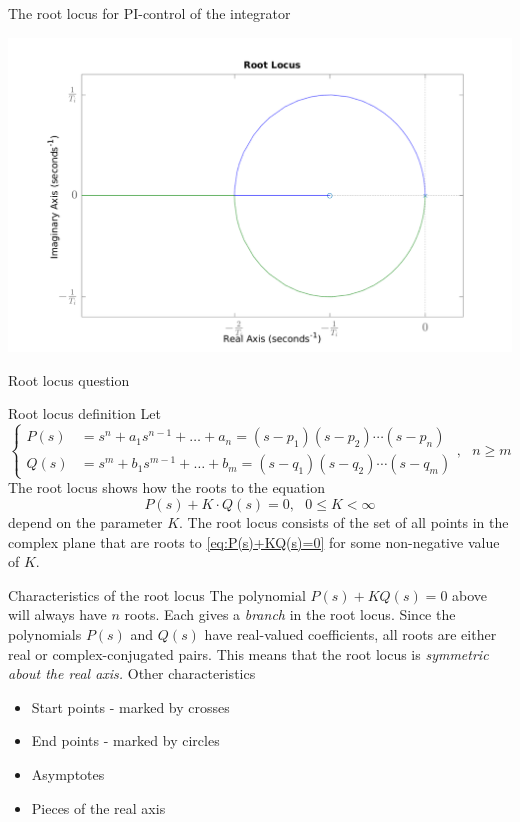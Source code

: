 \documentclass[presentation,aspectratio=169]{beamer}
\begin{document}
\begin{frame}[label={sec:org713aeac}]{The root locus for PI-control of the integrator}
\begin{center}
\includegraphics[width=0.8\linewidth]{../../figures/rlocus-integrator-PI}
\end{center}
\end{frame}

\begin{frame}[label={sec:org199e90e}]{Root locus question}
\end{frame}

\begin{frame}[label={sec:orgb1887b7}]{Root locus definition}
Let
\[\begin{cases} P(s)&=s^n+a_1s^{n-1}+\dots+a_n = (s-p_1)(s-p_2)\cdots(s-p_n)\\ 
Q(s)&=s^m+b_1s^{m-1}+\dots+b_m=(s-q_1)(s-q_2)\cdots(s-q_m) \end{cases},\ \ \ n\ge m \]
The root locus shows how the roots to the equation
\begin{equation}
\label{eq:P(s)+KQ(s)=0}
P(s)+K\cdot Q(s)=0,\ \ \ 0\le K<\infty
\end{equation}
depend on the parameter \(K\). The root locus consists of the set of all points in the complex plane that are roots to \eqref{eq:P(s)+KQ(s)=0} for some non-negative value of \(K\).
\end{frame}

\begin{frame}[label={sec:org2f34635}]{Characteristics of the root locus}
The polynomial \(P(s)+KQ(s)=0\) above will always have \(n\) roots. Each gives a \emph{branch} in the root locus. Since the polynomials \(P(s)\) and \(Q(s)\) have real-valued coefficients, all roots are either real or complex-conjugated pairs. This means that the root locus is \emph{symmetric about the real axis.} Other characteristics
\begin{itemize}
\item Start points - marked by crosses
\item End points - marked  by circles
\item Asymptotes
\item Pieces of the real axis
\end{itemize}
\end{frame}
\end{document}
